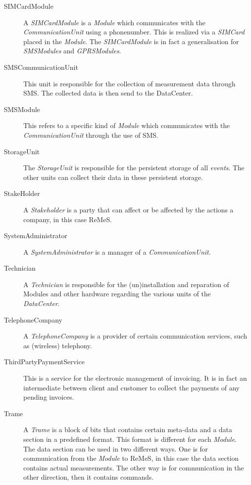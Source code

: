 \begin{description}
\item[SIMCardModule] A \emph{SIMCardModule} is a \emph{Module} which
communicates with the \emph{CommunicationUnit} using a phonenumber. This is
realized via a \emph{SIMCard} placed in the \emph{Module}. The
\emph{SIMCardModule} is in fact a generalisation for \emph{SMSModules} and
\emph{GPRSModules}.

\item[SMSCommunicationUnit] This unit is responsible for the collection of
measurement data through SMS. The collected data is then send to the DataCenter.

\item[SMSModule] This refers to a specific kind of \emph{Module} which
communicates with the \emph{CommunicationUnit} through the use of SMS.

\item[StorageUnit] The \emph{StorageUnit} is responsible for the persistent
storage of all \emph{events}. The other units can collect their data in these
persistent storage.

\item[StakeHolder]A \emph{Stakeholder} is a party that can affect or be
affected by the actions a company, in this case ReMeS.

\item[SystemAdministrator] A \emph{SystemAdministrator} is a manager of a
\emph{CommunicationUnit}. %

\item[Technician] A \emph{Technician} is responsible for the (un)installation
and reparation of Modules and other hardware regarding the various units of the
\emph{DataCenter}.

\item[TelephoneCompany] A \emph{TelephoneCompany} is a provider of certain
communication services, such as (wireless) telephony.

\item[ThirdPartyPaymentService] This is a service for the electronic management
of invoicing. It is in fact an intermediate between client and customer to
collect the payments of any pending invoices.

\item[Trame] A \emph{Trame} is a block of bits that contains certain meta-data
and a data section in a predefined format. This format is different for each
\emph{Module}. The data section can be used in two different ways. One is for
communication from the \emph{Module} to ReMeS, in this case the data section
contains actual measurements. The other way is for communication in the other
direction, then it contains commands.


\end{description}
